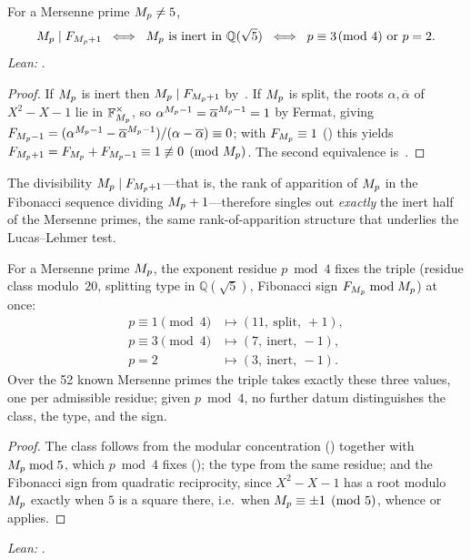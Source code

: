 \begin{Corollary}\label{prop:rank-inert}
For a Mersenne prime $M_{p}\neq5$,
\[
  M_{p}\mid F_{M_{p}+1}
  \;\iff\;
  M_{p}\ \text{is inert in }\mathbb{Q}(\sqrt5)
  \;\iff\;
  p\equiv3\!\!\pmod4\ \text{or}\ p=2.
\]
  \emph{Lean:} .
\end{Corollary}

\begin{proof}
If $M_{p}$ is inert then $M_{p}\mid F_{M_{p}+1}$ by~.  If
$M_{p}$ is split, the roots $\alpha,\overline{\alpha}$ of $X^{2}-X-1$ lie in
$\mathbb{F}_{M_{p}}^{\times}$, so $\alpha^{M_{p}-1}=\overline{\alpha}^{M_{p}-1}=1$
by Fermat, giving
$F_{M_{p}-1}=(\alpha^{M_{p}-1}-\overline{\alpha}^{M_{p}-1})/(\alpha-\overline{\alpha})\equiv0$;
with $F_{M_{p}}\equiv1$ () this yields
$F_{M_{p}+1}=F_{M_{p}}+F_{M_{p}-1}\equiv1\not\equiv0\pmod{M_{p}}$.  The second
equivalence is~.
\end{proof}

The divisibility $M_{p}\mid F_{M_{p}+1}$---that is, the rank of apparition of
$M_{p}$ in the Fibonacci sequence dividing $M_{p}+1$---therefore singles out
\emph{exactly} the inert half of the Mersenne primes, the same
rank-of-apparition structure that underlies the Lucas--Lehmer test.

\begin{Corollary}\label{cor:joint}
For a Mersenne prime $M_{p}$, the exponent residue $p\bmod4$ fixes the
triple (residue class modulo~$20$, splitting type in $\mathbb{Q}(\sqrt5)$,
Fibonacci sign $F_{M_{p}}\bmod M_{p}$) at once:
\[
  \begin{aligned}
    p\equiv1\!\!\pmod4 &\mapsto(11,\ \mathrm{split},\ +1),\\
    p\equiv3\!\!\pmod4 &\mapsto(7,\ \mathrm{inert},\ -1),\\
    p=2 &\mapsto(3,\ \mathrm{inert},\ -1).
  \end{aligned}
\]
Over the 52 known Mersenne primes the triple takes exactly these three
values, one per admissible residue; given $p\bmod4$, no further datum
distinguishes the class, the type, and the sign.
\begin{proof}
The class follows from the modular concentration
() together with $M_{p}\bmod5$, which
$p\bmod4$ fixes (); the type from the same
residue; and the Fibonacci sign from quadratic reciprocity, since
$X^{2}-X-1$ has a root modulo $M_{p}$ exactly when $5$ is a square there,
i.e.\ when $M_{p}\equiv\pm1\pmod5$, whence  or
 applies.
\end{proof}
\emph{Lean:} .
\end{Corollary}


